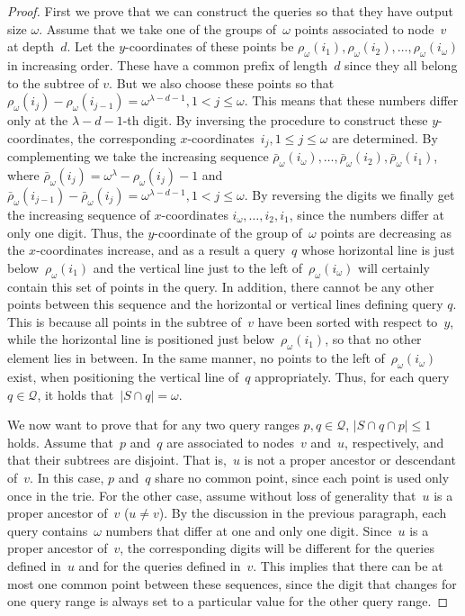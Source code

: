 \documentclass{sig-alternate}
\renewcommand{\(}{\left(}
\renewcommand{\)}{\right)}
\begin{document}
\begin{fullenv}
\begin{proof}
First we prove that we can construct the queries so that they have output size
$\omega$. Assume that we take one of the groups of~$\omega$ points associated
to node~$v$ at depth~$d$. Let the $y$-coordinates of these points be
$\rho_{\omega}(i_1),\rho_{\omega}(i_2),\ldots,\rho_{\omega}(i_{\omega})$ in
increasing order. These have a common prefix of length~$d$ since they all
belong to the subtree of $v$. But we also choose these points so that
$\rho_{\omega}(i_j) -\rho_{\omega}(i_{j-1}) =\omega^{\lambda-d-1}, 1 < j \leq
\omega$. This means that these numbers differ only at the $\lambda - d -1$-th
digit. By inversing the procedure to construct these $y$-coordinates, the
corresponding $x$-coordinates~$i_j, 1 \leq j \leq \omega$ are determined. By
complementing we take the increasing sequence $\bar{\rho}_{\omega}(i_{\omega}),
\ldots, \bar{\rho}_{\omega}(i_2), \bar{\rho}_{\omega}(i_1)$, where
$\bar{\rho}_{\omega}(i_j)=\omega^\lambda-\rho_{\omega}(i_j)-1 $ and
$\bar{\rho}_{\omega}(i_{j-1}) -\bar{\rho}_{\omega}(i_{j})
=\omega^{\lambda-d-1}, 1 < j \leq \omega$. By reversing the digits we finally
get the increasing sequence of $x$-coordinates $i_{\omega},\ldots,i_2,i_1$,
since the numbers differ at only one digit. Thus, the $y$-coordinate of the
group of~$\omega$ points are decreasing as the $x$-coordinates increase, and as
a result a query~$q$ whose horizontal line is just below~$\rho_{\omega}(i_1)$
and the vertical line just to the left of~$\rho_{\omega}(i_{\omega})$ will
certainly contain this set of points in the query. In addition, there cannot be
any other points between this sequence and the horizontal or vertical lines
defining query $q$. This is because all points in the subtree of~$v$ have been
sorted with respect to~$y$, while the horizontal line is positioned just
below~$\rho_{\omega}(i_1)$, so that no other element lies in between. In the
same manner, no points to the left of~$\rho_{\omega}(i_{\omega})$ exist, when
positioning the vertical line of~$q$ appropriately. Thus, for each query~$q \in
\mathcal{Q}$, it holds that~$|S\cap q|=\omega$.

We now want to prove that for any two query ranges $p,q \in \mathcal{Q}$, $|S
\cap q \cap p| \leq 1$ holds. Assume that~$p$ and~$q$ are associated to
nodes~$v$ and~$u$, respectively, and that their subtrees are disjoint. That
is,~$u$ is not a proper ancestor or descendant of~$v$. In this case, $p$
and~$q$ share no common point, since each point is used only once in the trie.
For the other case, assume without loss of generality that~$u$ is a proper
ancestor of~$v$ ($u \neq v$). By the discussion in the previous paragraph, each
query contains~$\omega$ numbers that differ at one and only one digit.
Since~$u$ is a proper ancestor of~$v$, the corresponding digits will be
different for the queries defined in~$u$ and for the queries defined in~$v$.
This implies that there can be at most one common point between these
sequences, since the digit that changes for one query range is always set to a
particular value for the other query range.
\end{proof}
\end{fullenv}
\end{document}
